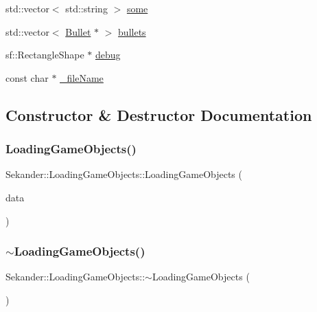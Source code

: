 \begin{DoxyCompactItemize}
\item 
std\+::vector$<$ std\+::string $>$ \hyperlink{classSekander_1_1LoadingGameObjects_ace89ee79603f4375a65ff4503b18b532}{some}
\item 
std\+::vector$<$ \hyperlink{classSekander_1_1Bullet}{Bullet} $\ast$ $>$ \hyperlink{classSekander_1_1LoadingGameObjects_a6148502878e84a5b56a22aa2916a4e3e}{bullets}
\item 
sf\+::\+Rectangle\+Shape $\ast$ \hyperlink{classSekander_1_1LoadingGameObjects_a14e02163016d771d35045b3ee995a7c0}{debug}
\item 
const char $\ast$ \hyperlink{classSekander_1_1LoadingGameObjects_afeb8ddb9d082cf4187bbe71d0995e4ef}{\+\_\+file\+Name}
\end{DoxyCompactItemize}


\subsection{Constructor \& Destructor Documentation}
\mbox{\label{classSekander_1_1LoadingGameObjects_a05bf4cf5351ede9b00a3c161576c82f1}} 
\subsubsection{\texorpdfstring{Loading\+Game\+Objects()}{LoadingGameObjects()}}
{\footnotesize\ttfamily Sekander\+::\+Loading\+Game\+Objects\+::\+Loading\+Game\+Objects (\begin{DoxyParamCaption}\item[{\hyperlink{namespaceSekander_a1d69b002ba2d23020901c28f0def5e16}{Game\+Data\+Ref}}]{data }\end{DoxyParamCaption})}

\mbox{\label{classSekander_1_1LoadingGameObjects_ac0a7e1349776ee6cb266f3c3c8cae4ba}} 
\subsubsection{\texorpdfstring{$\sim$\+Loading\+Game\+Objects()}{~LoadingGameObjects()}}
{\footnotesize\ttfamily Sekander\+::\+Loading\+Game\+Objects\+::$\sim$\+Loading\+Game\+Objects (\begin{DoxyParamCaption}{ }\end{DoxyParamCaption})}



